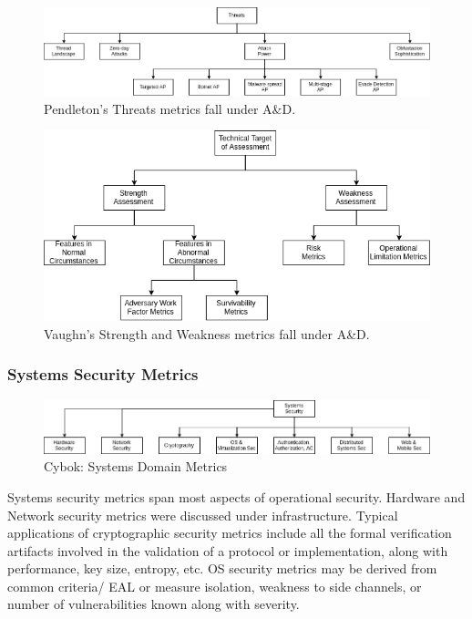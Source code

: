 \begin{figure}[ht]
\centering
\includegraphics[width=.95\linewidth]{resource/img/ch_background/cybok_metrics/pendleton_threats.png}
\caption{Pendleton’s Threats metrics fall under A\&D.
\label{fig:background:cybok_ad_pendleton_threats}}
\end{figure} 

\begin{figure}[ht]
\centering
\includegraphics[width=.75\linewidth]{resource/img/ch_background/cybok_metrics/vaughn_ttoa.png}
\caption{Vaughn’s Strength and Weakness metrics fall under A\&D.
\label{fig:background:cybok_ad_vaugh_ttoa}}
\end{figure} 

\subsubsection{Systems Security Metrics}

\begin{figure}[ht]

\begin{mdframed}
\centering
\includegraphics[width=.95\linewidth]{resource/img/ch_background/cybok_metrics/cybok_systems.png}
\end{mdframed}
\caption{Cybok: Systems Domain Metrics
\label{fig:background:cybok_sys_metrics}}
\end{figure} 

Systems security metrics span most aspects of operational security. Hardware and Network security metrics were discussed under infrastructure. Typical applications of cryptographic security metrics include all the formal verification artifacts involved in the validation of a protocol or implementation, along with performance, key size, entropy, etc. OS security metrics may be derived from common criteria/ EAL or measure isolation, weakness to side channels, or number of vulnerabilities known along with severity. 

